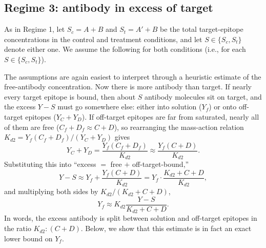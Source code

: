 \subsection{Regime 3: antibody in excess of target}

As in Regime 1, let $S_c=A+B$ and $S_t=A'+B$ be the total target-epitope
concentrations in the control and treatment conditions, and let
$S\in\{S_c,S_t\}$ denote either one. We assume the following for both
conditions (i.e., for each $S\in\{S_c,S_t\}$).

The assumptions are again easiest to interpret through a heuristic
estimate of the free-antibody concentration. Now there is more antibody
than target. If nearly every target epitope is bound, then about $S$
antibody molecules sit on target, and the excess $Y-S$ must go somewhere
else: either into solution ($Y_f$) or onto off-target epitopes
($Y_C+Y_D$). If off-target epitopes are far from saturated, nearly all of
them are free ($C_f+D_f\approx C+D$), so rearranging the mass-action
relation $K_{d2}=Y_f(C_f+D_f)/(Y_C+Y_D)$ gives
$$
Y_C+Y_D
=\frac{Y_f(C_f+D_f)}{K_{d2}}
\approx\frac{Y_f(C+D)}{K_{d2}}.
$$
Substituting this into ``excess $=$ free $+$ off-target-bound,''
$$
Y-S
\approx Y_f+\frac{Y_f(C+D)}{K_{d2}}
=Y_f\cdot\frac{K_{d2}+C+D}{K_{d2}},
$$
and multiplying both sides by $K_{d2}/(K_{d2}+C+D)$,
$$
Y_f\approx K_{d2}\frac{Y-S}{K_{d2}+C+D}.
$$
In words, the excess antibody is split between solution and off-target
epitopes in the ratio $K_{d2}:(C+D)$. Below, we show that this estimate
is in fact an exact lower bound on $Y_f$.

